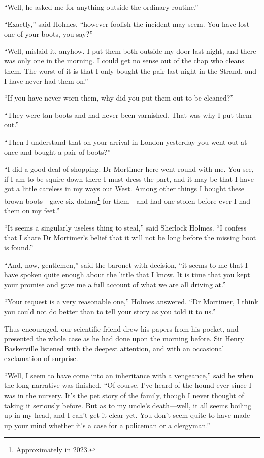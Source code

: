 \documentclass[paper=a5,BCOR=7mm,twoside,DIV=calc,12pt,usegeometry,openany,chapterprefix,endperiod,headings=big]{scrbook} %
\begin{document}
\enquote{Well, he asked me for anything outside the ordinary routine.}

\enquote{Exactly,} said Holmes, \enquote{however foolish the incident may seem. You have lost one of your boots, you say?}

\enquote{Well, mislaid it, anyhow. I put them both outside my door last night, and there was only one in the morning. I could get no sense out of the chap who cleans them. The worst of it is that I only bought the pair last night in the Strand, and I have never had them on.}

\enquote{If you have never worn them, why did you put them out to be cleaned?}

\enquote{They were tan boots and had never been varnished. That was why I put them out.}

\enquote{Then I understand that on your arrival in London yesterday you went out at once and bought a pair of boots?}

\enquote{I did a good deal of shopping. Dr Mortimer here went round with me. You see, if I am to be squire down there I must dress the part, and it may be that I have got a little careless in my ways out West. Among other things I bought these brown boots---gave six dollars\footnote{Approximately  in 2023.} for them---and had one stolen before ever I had them on my feet.}

\enquote{It seems a singularly useless thing to steal,} said Sherlock Holmes. \enquote{I confess that I share Dr Mortimer's belief that it will not be long before the missing boot is found.}

\enquote{And, now, gentlemen,} said the baronet with decision, \enquote{it seems to me that I have spoken quite enough about the little that I know. It is time that you kept your promise and gave me a full account of what we are all driving at.}

\enquote{Your request is a very reasonable one,} Holmes answered. \enquote{Dr Mortimer, I think you could not do better than to tell your story as you told it to us.}

Thus encouraged, our scientific friend drew his papers from his pocket, and presented the whole case as he had done upon the morning before. Sir Henry Baskerville listened with the deepest attention, and with an occasional exclamation of surprise.

\enquote{Well, I seem to have come into an inheritance with a vengeance,} said he when the long narrative was finished. \enquote{Of course, I've heard of the hound ever since I was in the nursery. It's the pet story of the family, though I never thought of taking it seriously before. But as to my uncle's death---well, it all seems boiling up in my head, and I can't get it clear yet. You don't seem quite to have made up your mind whether it's a case for a policeman or a clergyman.}
\end{document}
